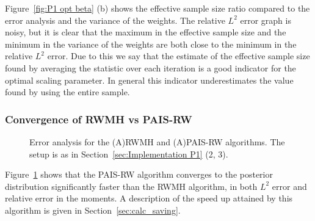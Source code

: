 \documentclass[final]{siamltex}
\begin{document}
Figure~\ref{fig:P1 opt beta} (b) shows the effective sample size ratio compared to the error analysis and the variance of the weights. The relative $L^2$ error graph is noisy, but it is clear that the maximum in the effective sample size and the minimum in the variance of the weights are both close to the minimum in the relative $L^2$ error. Due to this we say that the estimate of the effective sample size found by averaging the statistic over each iteration is a good indicator for the optimal scaling parameter. In general this indicator underestimates the value found by using the entire sample.

\subsubsection{Convergence of RWMH vs PAIS-RW}

\begin{figure}[htb]
\centering
{}
\caption{Error analysis for the (A)RWMH and (A)PAIS-RW algorithms. The setup is as in Section~\ref{sec:Implementation P1} (2, 3).}
\label{fig:MH1 L2}
\end{figure}

Figure~\ref{fig:MH1 L2} shows that the PAIS-RW algorithm converges to the posterior distribution significantly faster than the RWMH algorithm, in both $L^2$ error and relative error in the moments. A description of the speed up attained by this algorithm is given in Section~\ref{sec:calc_saving}.
\end{document}
